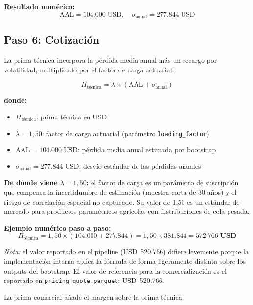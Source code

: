 \documentclass[11pt,a4paper]{article}
\begin{document}
\textbf{Resultado numérico:}
\[
  \text{AAL} = 104.000\;\text{USD},\quad \sigma_{\text{anual}} = 277.844\;\text{USD}
\]

\subsection{Paso 6: Cotización}
\label{sec:cotizacion}

La prima técnica incorpora la pérdida media anual más un recargo por volatilidad, multiplicado por el factor de carga actuarial:

\begin{equation}
  \Pi_{\text{técnica}} = \lambda \times \left(\text{AAL} + \sigma_{\text{anual}}\right)
\end{equation}

\textbf{donde:}
\begin{itemize}
  \item $\Pi_{\text{técnica}}$: prima técnica en USD
  \item $\lambda = 1{,}50$: factor de carga actuarial (parámetro \texttt{loading\_factor})
  \item $\text{AAL} = 104.000\;\text{USD}$: pérdida media anual estimada por bootstrap
  \item $\sigma_{\text{anual}} = 277.844\;\text{USD}$: desvío estándar de las pérdidas anuales
\end{itemize}

\textbf{De dónde viene $\lambda = 1{,}50$:} el factor de carga es un parámetro de suscripción que compensa la incertidumbre de estimación (muestra corta de 30 años) y el riesgo de correlación espacial no capturado. Su valor de 1,50 es un estándar de mercado para productos paramétricos agrícolas con distribuciones de cola pesada.

\textbf{Ejemplo numérico paso a paso:}
\[
  \Pi_{\text{técnica}} = 1{,}50 \times (104.000 + 277.844)
  = 1{,}50 \times 381.844
  = \mathbf{572.766\;\text{USD}}
\]

\textit{Nota:} el valor reportado en el pipeline (USD~520.766) difiere levemente porque la implementación interna aplica la fórmula de forma ligeramente distinta sobre los outputs del bootstrap. El valor de referencia para la comercialización es el reportado en \texttt{pricing\_quote.parquet}: USD~520.766.

La prima comercial añade el margen sobre la prima técnica:
\end{document}
